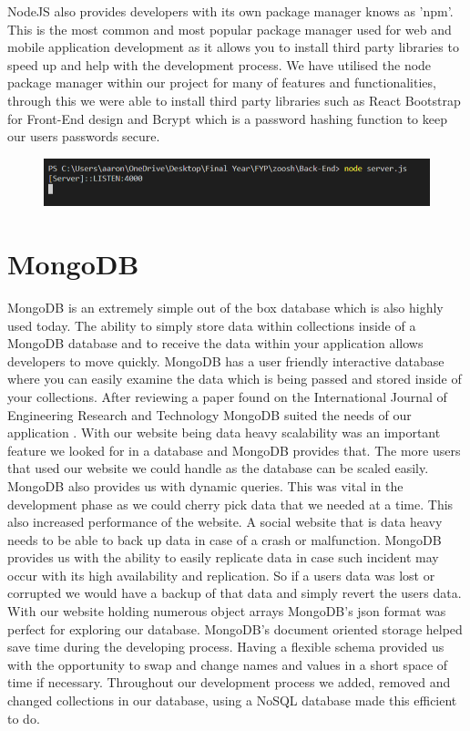 NodeJS also provides developers with its own package manager knows as 'npm'. This is the most common and most popular package manager used for web and mobile application development as it allows you to install third party libraries to speed up and help with the development process. We have utilised the node package manager within our project for many of features and functionalities, through this we were able to install third party libraries such as React Bootstrap for Front-End design and Bcrypt which is a password hashing function to keep our users passwords secure.

\begin{figure}[H]
  \centering
  \includegraphics[scale=0.55]{img/server.PNG}
  \label{fig:NodeJS Server running.}
\end{figure}

\section{MongoDB}
MongoDB is an extremely simple out of the box database which is also highly used today. The ability to simply store data within collections inside of a MongoDB database and to receive the data within your application allows developers to move quickly. MongoDB has a user friendly interactive database where you can easily examine the data which is being passed and stored inside of your collections.
After reviewing a paper found on the International Journal of Engineering Research and Technology MongoDB suited the needs of our application \cite{chauhan2019review}. With our website being data heavy scalability was an important feature we looked for in a database and MongoDB provides that. The more users that used our website we could handle as the database can be scaled easily. MongoDB also provides us with dynamic queries. This was vital in the development phase as we could cherry pick data that we needed at a time. This also increased performance of the website. A social website that is data heavy needs to be able to back up data in case of a crash or malfunction. MongoDB provides us with the ability to easily replicate data in case such incident may occur with its high availability and replication. So if a users data was lost or corrupted we would have a backup of that data and simply revert the users data.
With our website holding numerous object arrays MongoDB's json format was perfect for exploring our database. MongoDB's document oriented storage helped save time during the developing process\cite{MongoDB}.
Having a flexible schema provided us with the opportunity to swap and change names and values in a short space of time if necessary. Throughout our development process we added, removed and changed collections in our database, using a NoSQL database made this efficient to do.

